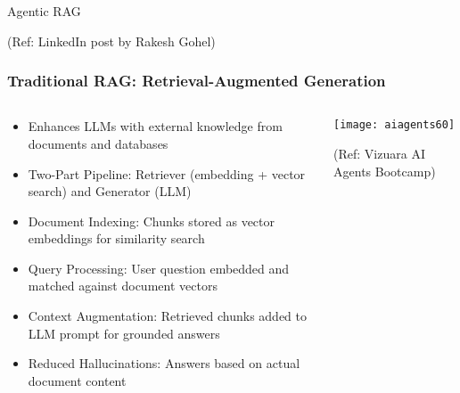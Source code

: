 \begin{frame}[fragile]\frametitle{}
\begin{center}
{\Large Agentic RAG}

{\tiny (Ref: LinkedIn post by Rakesh Gohel)}

\end{center}
\end{frame}


\begin{frame}[fragile]\frametitle{Traditional RAG: Retrieval-Augmented Generation}
\begin{columns}
    \begin{column}[T]{0.6\linewidth}
      \begin{itemize}
		\item Enhances LLMs with external knowledge from documents and databases
		\item Two-Part Pipeline: Retriever (embedding + vector search) and Generator (LLM)
		\item Document Indexing: Chunks stored as vector embeddings for similarity search
		\item Query Processing: User question embedded and matched against document vectors
		\item Context Augmentation: Retrieved chunks added to LLM prompt for grounded answers
		\item Reduced Hallucinations: Answers based on actual document content
	  \end{itemize}
    \end{column}
    \begin{column}[T]{0.4\linewidth}
		\begin{center}
		\texttt{[image: aiagents60]}
		
		{\tiny (Ref: Vizuara AI Agents Bootcamp)}
		\end{center}	
    \end{column}
  \end{columns}
\end{frame}

